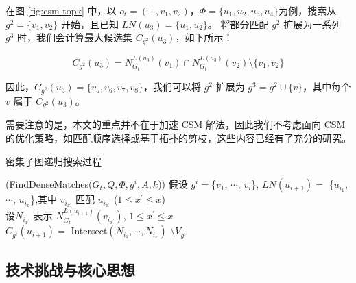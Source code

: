 在图 \ref{fig:csm-topk} 中，以 $o_t = (+,v_1,v_2)$，$\Phi = \{u_1,u_2,u_3,u_4\}$为例，搜索从 $g^2 = \{v_1,v_2\}$ 开始，且已知 $LN(u_3) = \{u_1, u_2\}$。
将部分匹配 $g^2$ 扩展为一系列 $g^3$ 时，我们会计算最大候选集 $C_{g^{2}}(u_3)$，如下所示：

\[
	C_{g^{2}}(u_{3}) =  N_{G_t}^{L(u_{3})}(v_{1})\cap N_{G_t}^{L(u_{3})}(v_{2})  \setminus \{v_1, v_2\}
\]

因此，$C_{g^{2}}(u_3) = \{v_5, v_6, v_7, v_8\}$，我们可以将 $g^2$ 扩展为 $g^3 = g^2 \cup \{v\}$，其中每个 $v$ 属于 $C_{g^{2}}(u_3)$。

需要注意的是，本文的重点并不在于加速 CSM 解法，因此我们不考虑面向 CSM 的优化策略，如匹配顺序选择或基于拓扑的剪枝，这些内容已经有了充分的研究。


\begin{algorithm}[h!]
	\small
	\caption{密集子图递归搜索过程}
	\label{alg:find-dense-matches}
	\iFunc(FindDenseMatches{(}$G_t, Q, \Phi, g^i, A, k${)})
	{
		假设 $g^{i}=$\{$v_{1}$, $\cdots$, $v_{i}$\}, $LN(u_{i+1})=$ \{$u_{i_1}$, $\cdots$, $u_{i_x}$\},其中 $v_{i_{x^\prime}}$ 匹配 $u_{i_{x^\prime}}$ ($1\leq x^\prime\leq x$)  \label{code:base-extension:begin} \\
		设$N_{i_{x^\prime}}$ 表示 $N_{G_t}^{L(u_{i+1})}(v_{i_{x^\prime}})$, $1\leq x^\prime\leq x$  \label{code:base-intersect:start} \\
		$C_{g^i}(u_{i+1})= $ Intersect$(N_{i_1}, \cdots, N_{i_x})$ $\setminus V_{g^i}$  \label{code:intersect}  \label{code:base-intersect:end}\\
		\Return 
	}
\end{algorithm}	

\subsection{技术挑战与核心思想}

